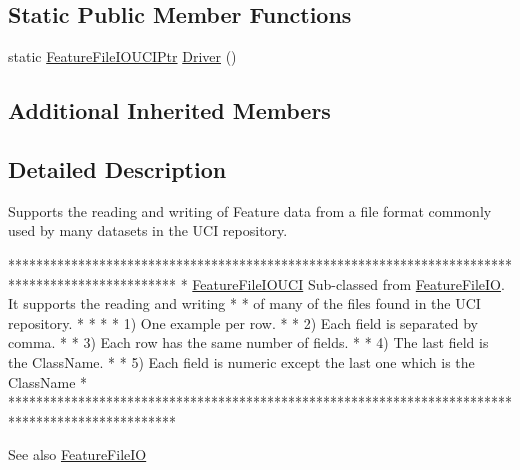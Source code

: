 \subsection*{Static Public Member Functions}
\begin{DoxyCompactItemize}
\item 
static \hyperlink{class_k_k_m_l_l_1_1_feature_file_i_o_u_c_i_a1453fcbcafd3fd7327385f77a2c94aa2}{Feature\+File\+I\+O\+U\+C\+I\+Ptr} \hyperlink{class_k_k_m_l_l_1_1_feature_file_i_o_u_c_i_a92ebde5cbd4c01809413a7e75d1d9cda}{Driver} ()
\end{DoxyCompactItemize}
\subsection*{Additional Inherited Members}


\subsection{Detailed Description}
Supports the reading and writing of Feature data from a file format commonly used by many dataset\textquotesingle{}s in the U\+CI repository. 


\begin{DoxyCode}
************************************************************************************************
*  \hyperlink{class_k_k_m_l_l_1_1_feature_file_i_o_u_c_i_a300cd20d7506d1c382089bc97c617957}{FeatureFileIOUCI}  Sub-classed from \hyperlink{class_k_k_m_l_l_1_1_feature_file_i_o_a820170380cfca6a036a29d2c51b8441a}{FeatureFileIO}.  It supports the reading 
      and writing      *
*  of many of the files found in the UCI repository.                                           *
*                                                                                              *
*  1) One example per row.                                                                     *
*  2) Each field is separated by comma.                                                        *
*  3) Each row has the same number of fields.                                                  *
*  4) The last field is the ClassName.                                                         *
*  5) Each field is numeric except the last one which is the ClassName                         *
************************************************************************************************
\end{DoxyCode}
 \begin{DoxySeeAlso}{See also}
\hyperlink{class_k_k_m_l_l_1_1_feature_file_i_o}{Feature\+File\+IO} 
\end{DoxySeeAlso}


